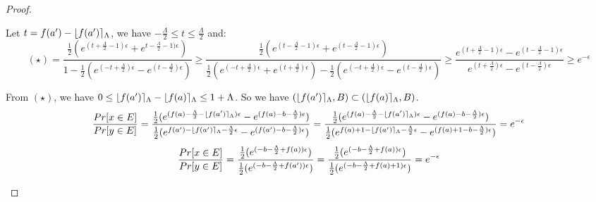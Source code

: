 \documentclass[a4paper,11pt]{article}
\begin{document}
\begin{proof}
\begin{itemize}
	Let $t = f(a') - \lfloor f(a') \rceil_{\Lambda}$, we have $-\frac{\Lambda}{2} \leq t \leq \frac{\Lambda}{2} $ and:
	\[
	(\star) = \frac{{\frac{1}{2}(
				e^{(t + \frac{\Lambda}{2} - 1)\epsilon}
				+ e^{t - \frac{\Lambda}{2} - 1)\epsilon})}
			}
			{1 - \frac{1}{2}(
				e^{(- t + \frac{\Lambda}{2})\epsilon}
				- e^{(t - \frac{\Lambda}{2})\epsilon})}
	\geq \frac{ \frac{1}{2}(
				e^{(t - \frac{\Lambda}{2} - 1)\epsilon}
				+ e^{(t -\frac{\Lambda}{2} - 1)\epsilon})
			}
			{\frac{1}{2}(
				e^{(-t + \frac{\Lambda}{2})\epsilon}
				+ e^{(t +\frac{\Lambda}{2})\epsilon}) 
				- \frac{1}{2}(
				e^{(-t + \frac{\Lambda}{2})\epsilon}
				- e^{(t - \frac{\Lambda}{2})\epsilon})}
	\geq \frac{
				e^{(t + \frac{\Lambda}{2} - 1)\epsilon}
				-
				e^{(t - \frac{\Lambda}{2} - 1)\epsilon}
			}
			{
				e^{(t + \frac{\Lambda}{2})\epsilon}
				- e^{(t - \frac{\Lambda}{2})\epsilon}
			}	
	\geq e^{-\epsilon}
	\]
	

	From $(\star)$, we have $0 \leq \lfloor f(a') \rceil_{\Lambda} - \lfloor f(a) \rceil_{\Lambda} \leq 1 + \Lambda$.
	So we have $(\lfloor f(a') \rceil_{\Lambda}, B) \subset (\lfloor f(a) \rceil_{\Lambda}, B)$.
	\[
	\frac{Pr[x \in E]}{Pr[y \in E]} 
	= \frac{\frac{1}{2}(
				e^{(f(a) - \frac{\Lambda}{2} - \lfloor f(a') \rceil_{\Lambda})\epsilon}
				- e^{(f(a) -b - \frac{\Lambda}{2})\epsilon})}
				{\frac{1}{2}(
				e^{f(a') - \lfloor f(a') \rceil_{\Lambda} -\frac{\Lambda}{2}\epsilon}
				- e^{(f(a') -b -\frac{\Lambda}{2})\epsilon})} \\
	= \frac{\frac{1}{2}(
				e^{(f(a) - \frac{\Lambda}{2} - \lfloor f(a') \rceil_{\Lambda})\epsilon}
				- e^{(f(a) -b - \frac{\Lambda}{2})\epsilon})}
				{\frac{1}{2}(
				e^{f(a) + 1 - \lfloor f(a') \rceil_{\Lambda} -\frac{\Lambda}{2}\epsilon}
				- e^{(f(a) + 1 -b -\frac{\Lambda}{2})\epsilon})} \\
	= e^{-\epsilon}
	\]
	\[
	\frac{Pr[x \in E]}{Pr[y \in E]} 
	= \frac{\frac{1}{2}(
				e^{(-b -\frac{\Lambda}{2} + f(a))\epsilon})}
				{\frac{1}{2}(
				e^{(-b -\frac{\Lambda}{2} + f(a'))\epsilon})} \\
	= \frac{\frac{1}{2}(
				e^{(-b -\frac{\Lambda}{2} + f(a))\epsilon})}
				{\frac{1}{2}(
				e^{(-b -\frac{\Lambda}{2} + f(a) + 1)\epsilon})} \\
	= e^{-\epsilon}
	\]



\end{itemize}

\end{proof}
\newpage


\end{document}
